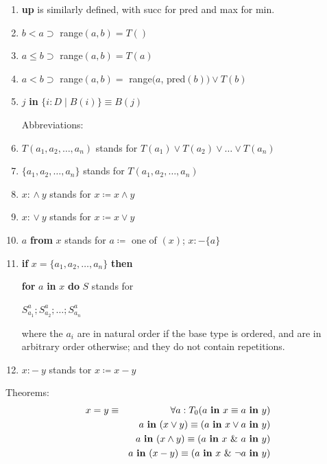 \documentclass[twoside,11pt]{book}
\begin{document}
\begin{enumerate}[wide, nosep, label=(\arabic*)]
	\quad \textbf{if} $a \neq T_0$.min \textbf{then} $T($pred$(a))$ \textbf{else} $T()$
	
	\item[(27)\textendash{}(28)] \textbf{up} is similarly defined, with succ for pred and max for min.
	\setcounter{enumi}{28}

	\item $b < a \supset$ range$(a, b) = T()$
	\item $a \leqslant b \supset$ range$(a, b) = T(a)$
	\item $a < b \supset$ range$(a, b) =$ range$(a$, pred$(b)) \lor T(b)$
	\item $j$ \textbf{in} $\{i:D \mid B(i)\} \equiv B(j)$

	\noindent
	Abbreviations:
	
	\item $T(a_1, a_2, \dots, a_n)$ stands for $T(a_1) \lor T(a_2) \lor \dots \lor T(a_n)$
	\item $\{a_1, a_2, \dots, a_n\}$ stands for $T(a_1, a_2, \dots, a_n)$
	\item $x$: $\land\ y$ stands for $x \coloneq x \land y$
	\item $x$: $\lor\ y$ stands for $x \coloneq x \lor y$
	\item $a$ \textbf{from} $x$ stands for $a \coloneq$ one of $(x)$; $x: - \{a\}$
	\item \textbf{if} $x = \{a_1, a_2, \dots, a_n\}$ \textbf{then}
	
	\qquad\quad \textbf{for} $a$ \textbf{in} $x$ \textbf{do} $S$ stands for
	
	\qquad\quad \quad $S_{a_1}^a; S_{a_2}^a ; \dots; S_{a_n}^a$
	
	\noindent
	where the $a_i$ are in natural order if the base type is ordered, and are in arbitrary order otherwise; and they do not contain repetitions.
	
	\item $x: -\ y$ stands tor $x \coloneq x - y$
\end{enumerate}

\noindent
Theorems:
\begin{eqnarray*}
	x = y &\equiv& \forall a:T_0(a \text{ \textbf{in} } x \equiv a \text{ \textbf{in} } y)\\
	&&a \text{ \textbf{in} } (x \lor y) \equiv (a \text{ \textbf{in} } x \lor a \text{ \textbf{in} } y) \\
	&&a \text{ \textbf{in} } (x \land y) \equiv (a \text{ \textbf{in} } x\ \&\ a \text{ \textbf{in} } y) \\
	&&a \text{ \textbf{in} } (x - y) \equiv (a \text{ \textbf{in} } x\ \&\ \neg a \text{ \textbf{in} } y) \\
\end{eqnarray*}
\end{document}
